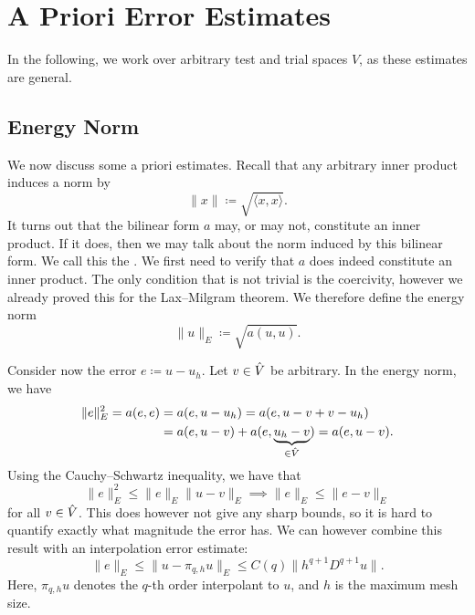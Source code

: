 \section{A Priori Error Estimates}
\label{sec:a_priori_estimates}

In the following, we work over arbitrary test and trial spaces \( V \), as
these estimates are general.

\subsection{Energy Norm}
We now discuss some a priori estimates. Recall that any arbitrary inner product
induces a norm by
\begin{equation}
    \| x \| \coloneqq \sqrt{ \langle x, x \rangle }.
\end{equation}
It turns out that the bilinear form \( a \) may, or may not, constitute an
inner product. If it does, then we may talk about the norm induced by this
bilinear form.  We call this the . We first need to verify
that \( a \) does indeed constitute an inner product. The only condition that
is not trivial is the coercivity, however we already proved this for the
Lax--Milgram theorem. We therefore define the energy norm
\begin{equation}
    \|u\|_E \coloneqq \sqrt{a(u, u)}.
\end{equation}

Consider now the error \( e \coloneqq u - u_h \). Let \(v \in \hat{V}\) be
arbitrary. In the energy norm, we have
\begin{align}
    \| e \|_E^2 = a(e, e) &= a(e, u - u_h) = a(e, u - v + v - u_h) \\
                          &= a(e, u - v) + a(e, \underbrace{u_h - v}_{\in \hat{V}}) = a(e, u-v).
\end{align}
Using the Cauchy--Schwartz inequality, we have that
\begin{equation}
     \| e \|_E^2 \leq \|e\|_E \|u - v\|_E \implies \| e \|_E \leq \|e - v\|_E
\end{equation}
for all \( v \in \hat{V} \). This does however not give any sharp bounds, so it
is hard to quantify exactly what magnitude the error has. We can however
combine this result with an interpolation error estimate:
\begin{equation}
    \| e \|_E \leq \| u - \pi_{q, h} u\|_E \leq C(q) \| h^{q + 1}
    D^{q+1} u\|.
\end{equation}
Here, \( \pi_{q, h} u\) denotes the \( q \)-th order interpolant to \( u \),
and \( h \) is the maximum mesh size.


